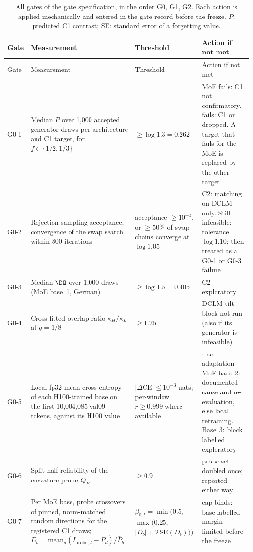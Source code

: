 \begin{longtable}{@{}>{\raggedright\arraybackslash}p{1.15cm}>{\raggedright\arraybackslash}p{5.4cm}>{\raggedright\arraybackslash}p{2.7cm}>{\raggedright\arraybackslash}p{5.2cm}@{}}
\caption{All gates of the gate specification, in the order G0, G1, G2. Each action is applied mechanically and entered in the gate record before the freeze. $P$: predicted C1 contrast; SE: standard error of a forgetting value.}\label{tab:gatesfull}\\
\toprule
Gate & Measurement & Threshold & Action if not met\\
\midrule
\endfirsthead
\toprule
Gate & Measurement & Threshold & Action if not met\\
\midrule
\endhead
\bottomrule
\endfoot
G0-1 & Median $P$ over 1,000 accepted generator draws per architecture and C1 target, for $f\in\{1/2,1/3\}$ & $\ge\log1.3=0.262$ & MoE fails: C1 not confirmatory. \nestor{} fails: C1 on \nestor{} dropped. A target that fails for the MoE is replaced by the other target\\
G0-2 & Rejection-sampling acceptance; convergence of the swap search within 800 iterations & acceptance $\ge10^{-3}$, or $\ge50\%$ of swap chains converge at $\log1.05$ & C2: matching on DCLM only. Still infeasible: tolerance $\log1.10$; then treated as a G0-1 or G0-3 failure\\
G0-3 & Median $\DQ$ over 1,000 draws (MoE base~1, German) & $\ge\log1.5=0.405$ & C2 exploratory\\
G0-4 & Cross-fitted overlap ratio $\kappa_H/\kappa_L$ at $q=1/8$ & $\ge1.25$ & DCLM-tilt block not run (also if its generator is infeasible)\\
G0-5 & Local fp32 mean cross-entropy of each H100-trained base on the first 10,004,085 val09 tokens, against its H100 value & $|\Delta\mathrm{CE}|\le10^{-3}$ nats; per-window $r\ge0.999$ where available & \nestor{}: no \nestor{} adaptation. MoE base~2: documented cause and re-evaluation, else local retraining. Base~3: block labelled exploratory\\
G0-6 & Split-half reliability of the curvature probe $Q_E$ & $\ge0.9$ & probe set doubled once; reported either way\\
G0-7 & Per MoE base, probe crossovers of pinned, norm-matched random directions for the registered C1 draws; $D_b=\mathrm{mean}_d(I_{\mathrm{probe},d}-P_d)/\bar P_b$ & $\beta_{0,b}=\min(0.5,$ $\max(0.25,$ $|D_b|+2\,\mathrm{SE}(D_b)))$ & cap binds: base labelled margin-limited before the freeze\\

\end{longtable}
